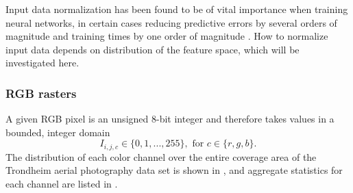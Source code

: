 Input data normalization has been found to be of vital importance when training neural networks, in certain cases reducing predictive errors by several orders of magnitude and training times by one order of magnitude \cite{input_normalization_1997}.
How to normalize input data depends on distribution of the feature space, which will be investigated here.

\subsubsection*{RGB rasters}

A given RGB pixel is an unsigned 8-bit integer and therefore takes values in a bounded, integer domain
%
\begin{equation*}
  I_{i,j,c} \in \{0, 1, ..., 255\}, \text{ for } c \in \{r, g, b\}.
\end{equation*}
%
The distribution of each color channel over the entire coverage area of the Trondheim aerial photography data set is shown in , and aggregate statistics for each channel are listed in .

\begin{figure}[htb]
  \begin{floatrow}
  \end{floatrow}
\end{figure}

